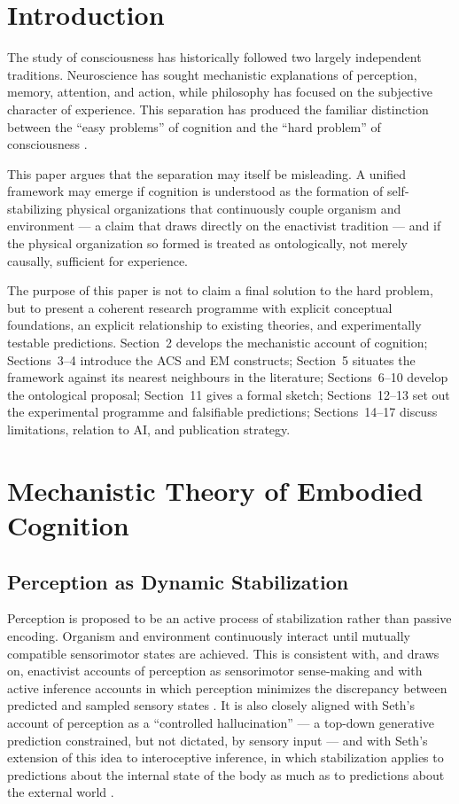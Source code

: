 \documentclass[11pt]{article}
\begin{document}
\section{Introduction}

The study of consciousness has historically followed two largely independent traditions. Neuroscience has sought mechanistic explanations of perception, memory, attention, and action, while philosophy has focused on the subjective character of experience. This separation has produced the familiar distinction between the ``easy problems'' of cognition and the ``hard problem'' of consciousness \citep*{chalmers1996}.

This paper argues that the separation may itself be misleading. A unified framework may emerge if cognition is understood as the formation of self-stabilizing physical organizations that continuously couple organism and environment --- a claim that draws directly on the enactivist tradition \citep*{varela1991} --- and if the physical organization so formed is treated as ontologically, not merely causally, sufficient for experience.

The purpose of this paper is not to claim a final solution to the hard problem, but to present a coherent research programme with explicit conceptual foundations, an explicit relationship to existing theories, and experimentally testable predictions. Section~2 develops the mechanistic account of cognition; Sections~3--4 introduce the ACS and EM constructs; Section~5 situates the framework against its nearest neighbours in the literature; Sections~6--10 develop the ontological proposal; Section~11 gives a formal sketch; Sections~12--13 set out the experimental programme and falsifiable predictions; Sections~14--17 discuss limitations, relation to AI, and publication strategy.

\section{Mechanistic Theory of Embodied Cognition}

\subsection{Perception as Dynamic Stabilization}

Perception is proposed to be an active process of stabilization rather than passive encoding. Organism and environment continuously interact until mutually compatible sensorimotor states are achieved. This is consistent with, and draws on, enactivist accounts of perception as sensorimotor sense-making \citep*{noe2004,thompson2007} and with active inference accounts in which perception minimizes the discrepancy between predicted and sampled sensory states \citep*{friston2010}. It is also closely aligned with Seth's account of perception as a ``controlled hallucination'' --- a top-down generative prediction constrained, but not dictated, by sensory input \citep*{seth2021a} --- and with Seth's extension of this idea to interoceptive inference, in which stabilization applies to predictions about the internal state of the body as much as to predictions about the external world \citep*{seth2021a,tschantz2022}.
\end{document}
